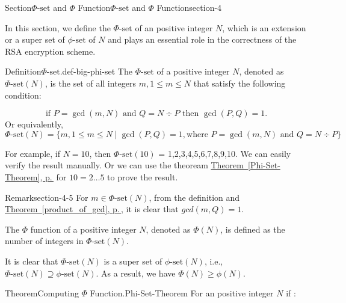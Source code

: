 \documentclass[oneside,12pt,]{article}
\newcommand{\xreffont}{\relax}
\numberwithin{equation}{section}
\begin{document}
\begin{sectionptx}{Section}{\(\Phi\text{-set}\) and \(\Phi\) Function}{}{\(\Phi\text{-set}\) and \(\Phi\) Function}{}{}{section-4}
\begin{introduction}{}%
In this section, we define the \(\Phi\text{-set}\) of an positive integer \(N\), which is an extension or a super set of \(\phi\text{-set}\) of \(N\) and plays an essential role in the correctness of the RSA encryption scheme.%
\end{introduction}%
\begin{definition}{Definition}{\(\Phi\text{-set}\).}{def-big-phi-set}%
The \(\Phi\text{-set}\) of a positive integer \(N\), denoted as \(\Phi\text{-set}(N)\), is the set of all integers \(m, 1 \leq m \leq N\) that satisfy the following condition:%
\par
%
\begin{equation*}
\text{if } P = \gcd(m, N) \text{ and } Q = N \div P \text{ then } \gcd(P, Q) = 1\text{.}
\end{equation*}
Or equivalently,%
\begin{equation*}
\Phi\text{-set}(N) = \{m, 1 \leq m \leq N \mid \gcd(P,Q) = 1, \text{where } P = \gcd(m, N) \text{ and } Q = N \div P\}
\end{equation*}
%
\end{definition}
For example, if \(N = 10\), then \(\Phi\text{-set}(10)\) = \textbraceleft{}1,2,3,4,5,6,7,8,9,10\textbraceright{}. We can easily verify the result manually. Or we can use the theoream \hyperref[Phi-Set-Theorem]{Theorem~{\xreffont\ref{Phi-Set-Theorem}}, p.\,\pageref{Phi-Set-Theorem}} for \(10 = 2 \ldots 5\) to prove the result.%
\begin{remark}{Remark}{}{section-4-5}%
For \(m \in \Phi\text{-set}(N)\), from the definition and \hyperref[product_of_gcd]{Theorem~{\xreffont\ref{product_of_gcd}}, p.\,\pageref{product_of_gcd}}, it is clear that \(gcd(m, Q) = 1\).%
\end{remark}
The \(\Phi\) function of a positive integer \(N\), denoted as \(\Phi(N)\), is defined as the number of integers in \(\Phi\text{-set}(N)\).%
\par
It is clear that \(\Phi\text{-set}(N)\) is a super set of \(\phi\text{-set}(N)\), i.e., \(\Phi\text{-set}(N) \supseteq \phi\text{-set}(N)\). As a result, we have \(\Phi(N) \geq \phi(N)\).%
\begin{theorem}{Theorem}{Computing \(\Phi\) Function.}{}{Phi-Set-Theorem}%
For an positive integer \(N\) if :%
\begin{equation*}

\end{equation*}
\end{theorem}
\end{sectionptx}
\end{document}
